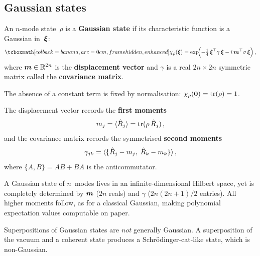 \subsection{Gaussian states}\label{sec:gaussian-states}

\begin{definition}\label{def:gaussian}
  An $n$-mode state~$\rho$ is a \textbf{Gaussian state} if its
  characteristic function is a Gaussian in~$\boldsymbol{\xi}$:
  \begin{equation}\label{eq:gaussian-char-fn}
    \eqbox{\chi_\rho(\vb{\xi})
      = \exp\!\Bigl(
          -\tfrac{1}{4}\,\vb{\xi}^\top \gamma\, \vb{\xi}
          - i\,\vb{m}^\top \sigma\, \vb{\xi}
        \Bigr)}\,,
  \end{equation}
  where $\boldsymbol{m} \in \mathbb{R}^{2n}$ is the \textbf{displacement vector} and
  $\gamma$ is a real $2n \times 2n$ symmetric matrix called the
  \textbf{covariance matrix}.
\end{definition}

The absence of a constant term is fixed by normalisation:
$\chi_\rho(\boldsymbol{0}) = \operatorname{tr}(\rho) = 1$.

The displacement vector records the \textbf{first moments}
\begin{equation}\label{eq:first-moments}
  m_j = \langle \hat{R}_j \rangle = \operatorname{tr}(\rho\, \hat{R}_j)\,,
\end{equation}
and the covariance matrix records the symmetrised \textbf{second
moments}
\begin{equation}\label{eq:second-moments}
  \gamma_{jk}
  = \langle \{\hat{R}_j - m_j,\; \hat{R}_k - m_k\} \rangle\,,
\end{equation}
where $\{A,B\} = AB + BA$ is the anticommutator.

\begin{intuition}
  A Gaussian state of $n$~modes lives in an infinite-dimensional
  Hilbert space, yet is completely determined by $\boldsymbol{m}$ ($2n$ reals)
  and $\gamma$ ($2n(2n+1)/2$ entries).  All higher moments follow, as
  for a classical Gaussian, making polynomial expectation values
  computable on paper.
\end{intuition}

\begin{remark}
  Superpositions of Gaussian states are \emph{not} generally Gaussian.
  A superposition of the vacuum and a coherent state produces a
  Schr\"odinger-cat-like state, which is non-Gaussian.
\end{remark}


